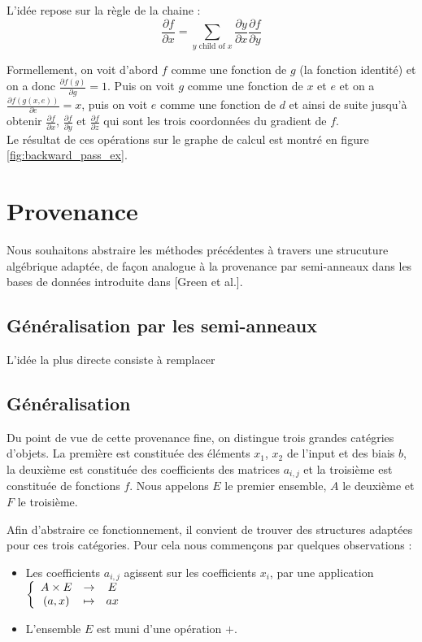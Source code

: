 \documentclass[11pt,a4paper]{article}
\begin{document}
L'idée repose sur la règle de la chaine : 
	$$ \frac{\partial f}{\partial x} = \underset{y \text{ child of }x}{\sum} \frac{\partial y}{\partial x} \frac{\partial f}{\partial y} $$
	
	Formellement, on voit d'abord $f$ comme une fonction de $g$ (la fonction identité) et on a donc $\frac{\partial f(g)}{\partial g} = 1$. Puis on voit $g$ comme une fonction de $x$ et $e$ et on a $\frac{\partial f(g(x,e))}{\partial e}=x$, puis on voit $e$ comme une fonction de $d$ et ainsi de suite jusqu'à obtenir $\frac{\partial f}{\partial x}$, $\frac{\partial f}{\partial y}$ et $\frac{\partial f}{\partial z}$ qui sont les trois coordonnées du gradient de $f$.\\
	
	Le résultat de ces opérations sur le graphe de calcul est montré en figure \ref{fig:backward_pass_ex}.

\section{Provenance}

Nous souhaitons abstraire les méthodes précédentes à travers une strucuture algébrique adaptée, de façon analogue à la provenance par semi-anneaux dans les bases de données introduite dans [Green et al.].

	\subsection{Généralisation par les semi-anneaux}

	L'idée la plus directe consiste à remplacer

	\subsection{Généralisation}

	Du point de vue de cette provenance fine, on distingue trois grandes catégries d'objets. La première est constituée des éléments $x_1$, $x_2$ de l'input et des biais $b$, la deuxième est constituée des coefficients des matrices $a_{i,j}$ et la troisième est constituée de fonctions $f$. Nous appelons $E$ le premier ensemble, $A$ le deuxième et $F$ le troisième.
	
	Afin d'abstraire ce fonctionnement, il convient de trouver des structures adaptées pour ces trois catégories. Pour cela nous commençons par quelques observations :
	
	\begin{itemize}
	
		\item Les coefficients $a_{i,j}$ agissent sur les coefficients $x_{i}$, par une application 
		$\left\lbrace \begin{array}{c c c}
		 A \times E & \to & E \\
		 (a,x) & \mapsto & ax
\end{array}
\right.$
		
		\item L'ensemble $E$ est muni d'une opération $+$.
	
	\end{itemize}
\end{document}
